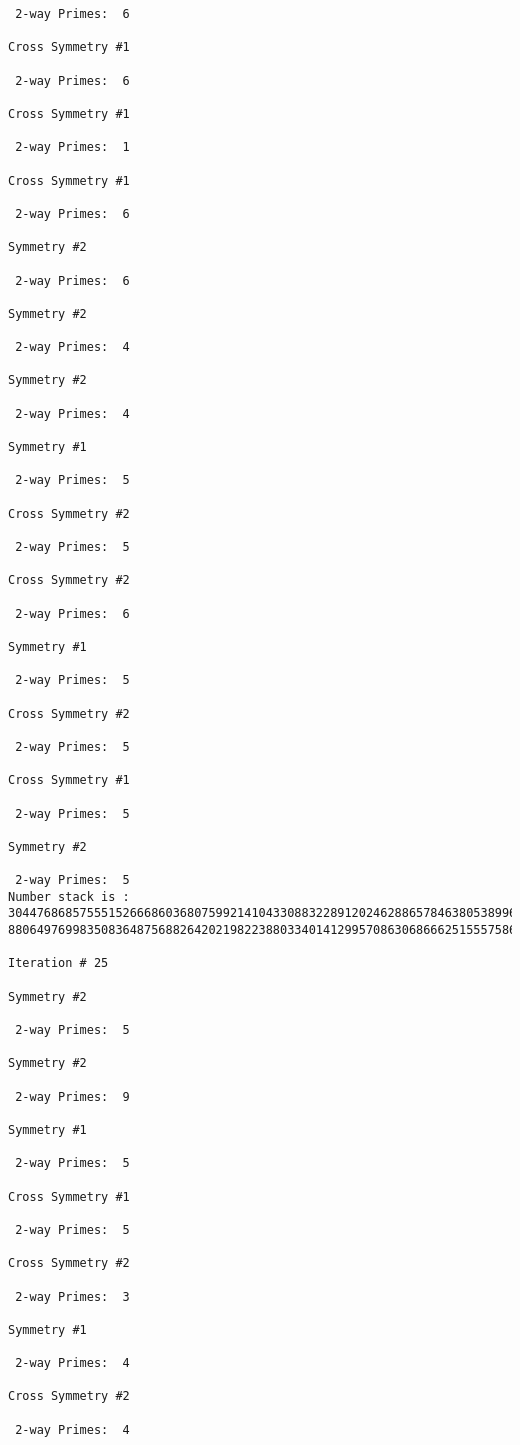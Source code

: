 \begin{verbatim}
 2-way Primes: 	6

Cross Symmetry #1

 2-way Primes: 	6

Cross Symmetry #1

 2-way Primes: 	1

Cross Symmetry #1

 2-way Primes: 	6

Symmetry #2

 2-way Primes: 	6

Symmetry #2

 2-way Primes: 	4

Symmetry #2

 2-way Primes: 	4

Symmetry #1

 2-way Primes: 	5

Cross Symmetry #2

 2-way Primes: 	5

Cross Symmetry #2

 2-way Primes: 	6

Symmetry #1

 2-way Primes: 	5

Cross Symmetry #2

 2-way Primes: 	5

Cross Symmetry #1

 2-way Primes: 	5

Symmetry #2

 2-way Primes: 	5
Number stack is :
30447686857555152666860368075992141043308832289120246288657846380538996794608835958544046240163340857
88064976998350836487568826420219822388033401412995708630686662515557586867440375804336104264044585953

Iteration #	25

Symmetry #2

 2-way Primes: 	5

Symmetry #2

 2-way Primes: 	9

Symmetry #1

 2-way Primes: 	5

Cross Symmetry #1

 2-way Primes: 	5

Cross Symmetry #2

 2-way Primes: 	3

Symmetry #1

 2-way Primes: 	4

Cross Symmetry #2

 2-way Primes: 	4


\end{verbatim}
